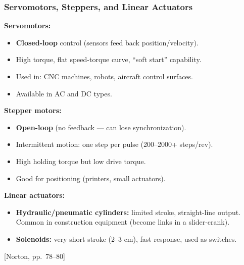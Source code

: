 \documentclass[10pt,aspectratio=43]{beamer}
\newcommand{\pref}[1]{\vfill\hfill{\scriptsize\color{gray}[Norton, pp.~#1]}}
\begin{document}
\begin{frame}
\frametitle{Servomotors, Steppers, and Linear Actuators}

\textbf{Servomotors:}
\begin{itemize}
  \item \textbf{Closed-loop} control (sensors feed back position/velocity).
  \item High torque, flat speed-torque curve, ``soft start'' capability.
  \item Used in: CNC machines, robots, aircraft control surfaces.
  \item Available in AC and DC types.
\end{itemize}

\vspace{4pt}
\textbf{Stepper motors:}
\begin{itemize}
  \item \textbf{Open-loop} (no feedback --- can lose synchronization).
  \item Intermittent motion: one step per pulse (200--2000+ steps/rev).
  \item High holding torque but low drive torque.
  \item Good for positioning (printers, small actuators).
\end{itemize}

\vspace{4pt}
\textbf{Linear actuators:}
\begin{itemize}
  \item \textbf{Hydraulic/pneumatic cylinders:} limited stroke, straight-line output. Common in construction equipment (become links in a slider-crank).
  \item \textbf{Solenoids:} very short stroke (2--3 cm), fast response, used as switches.
\end{itemize}
\pref{78--80}
\end{frame}

\end{document}
